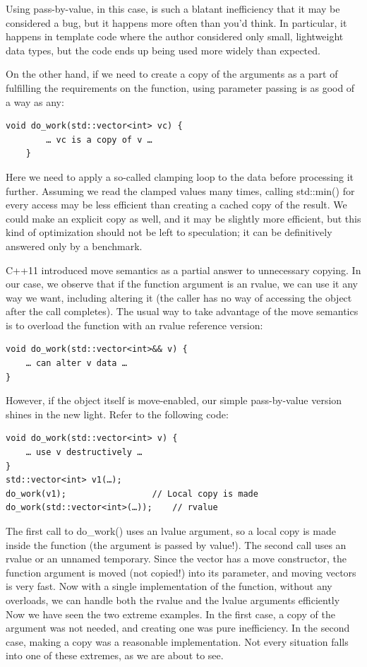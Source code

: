 Using pass-by-value, in this case, is such a blatant inefficiency that it may be considered a bug, but it happens more often than you’d think. In particular, it happens in template code where the author considered only small, lightweight data types, but the code ends up being used more widely than expected.

On the other hand, if we need to create a copy of the arguments as a part of fulfilling the requirements on the function, using parameter passing is as good of a way as any:

\begin{lstlisting}[style=styleCXX]
	void do_work(std::vector<int> vc) {
		… vc is a copy of v …
	}
\end{lstlisting}

Here we need to apply a so-called clamping loop to the data before processing it further. Assuming we read the clamped values many times, calling std::min() for every access may be less efficient than creating a cached copy of the result. We could make an explicit copy as well, and it may be slightly more efficient, but this kind of optimization should not be left to speculation; it can be definitively answered only by a benchmark.

C++11 introduced move semantics as a partial answer to unnecessary copying. In our case, we observe that if the function argument is an rvalue, we can use it any way we want, including altering it (the caller has no way of accessing the object after the call completes). The usual way to take advantage of the move semantics is to overload the function with an rvalue reference version:

\begin{lstlisting}[style=styleCXX]
void do_work(std::vector<int>&& v) {
	… can alter v data … 
}
\end{lstlisting}

However, if the object itself is move-enabled, our simple pass-by-value version shines in the new light. Refer to the following code:

\begin{lstlisting}[style=styleCXX]
void do_work(std::vector<int> v) {
	… use v destructively … 
}
std::vector<int> v1(…);
do_work(v1);                 // Local copy is made
do_work(std::vector<int>(…));    // rvalue
\end{lstlisting}

The first call to do\_work() uses an lvalue argument, so a local copy is made inside the function (the argument is passed by value!). The second call uses an rvalue or an unnamed temporary. Since the vector has a move constructor, the function argument is moved (not copied!) into its parameter, and moving vectors is very fast. Now with a single implementation of the function, without any overloads, we can handle both the rvalue and the lvalue arguments efficiently Now we have seen the two extreme examples. In the first case, a copy of the argument was not needed, and creating one was pure inefficiency. In the second case, making a copy was a reasonable implementation. Not every situation falls into one of these extremes, as we are about to see.

